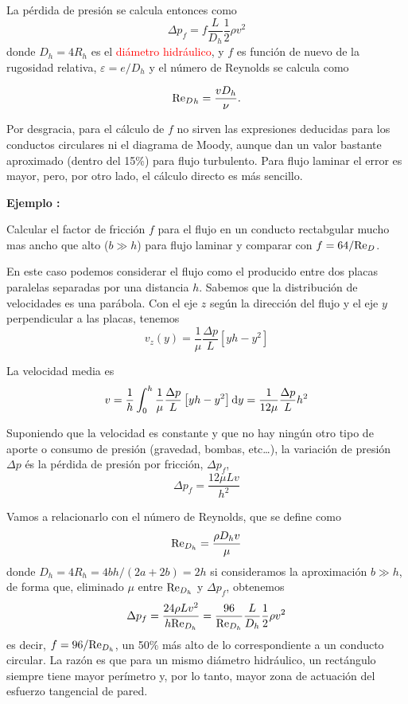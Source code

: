 La pérdida de presión se calcula entonces como
\[
\Delta p_f = f \frac{L}{D_h} \frac{1}{2} \rho v^2
\]
donde $D_h = 4 R_h$ es el \textcolor{red}{diámetro hidráulico}, y $f$ es función de nuevo de la rugosidad relativa, $\varepsilon= e/D_h$ y el número de Reynolds se calcula como

\begin{equation}
	{\text{Re}_D}_h = \frac{v D_h}{\nu}.
\end{equation}


Por desgracia, para el cálculo de $f$ no sirven las expresiones deducidas para los conductos circulares ni el diagrama de Moody, aunque dan un valor bastante aproximado (dentro del 15\%) para flujo turbulento. Para flujo laminar el error es mayor, pero, por otro lado, el cálculo directo es más sencillo.

\textbf{Ejemplo : }

Calcular el factor de fricción $f$ para el flujo en un conducto rectabgular mucho mas ancho que alto ($b \gg h$) para flujo laminar y comparar con $f=64/\text{Re}_D$.

En este caso podemos considerar el flujo como el producido entre dos placas paralelas separadas por una distancia $h$. Sabemos que la distribución de velocidades es una parábola. Con el eje $z$ según la dirección del flujo y el eje $y$ perpendicular a las placas, tenemos
\[
v_z(y) = \frac{1}{\mu}\frac{\Delta p}{L}\left[y h -y^2\right]
\]

La velocidad media es
\[
v = \frac{1}{h}\int_0^h\frac{1}{\mu}\frac{\Delta p}{L}\left[y h -y^2\right] \text{d} y =
\frac{1}{12 \mu}\frac{\Delta p}{L} h^2
\]

Suponiendo que la velocidad es constante y que no hay ningún otro tipo de aporte o consumo de presión (gravedad, bombas, etc\ldots), la variación de presión $\Delta p$ és la pérdida de presión por fricción, $\Delta p_f$,
\[
\Delta p_f = \frac{12 \mu L v} {h^2}
\]

Vamos a relacionarlo con el número de Reynolds, que se define como
\[
\text{Re}_{D_h} = \frac{\rho D_h v}{\mu}
\]
donde $D_h = 4R_h = 4bh/(2a+2b)=2h$ si consideramos la aproximación $b \gg h$, de forma que, eliminado $\mu$ entre $\text{Re}_{D_h}$ y $\Delta p_f$, obtenemos
\[
\Delta p_f = \frac{24 \rho L v^2}{h\text{Re}_{D_h}} = \frac{96}{\text{Re}_{D_h}} \frac{L}{D_h} \frac{1}{2}\rho v^2
\]
es decir, $f ={96}/{\text{Re}_{D_h}}$, un 50\% más alto de lo correspondiente a un conducto circular.  La razón es que para un mismo diámetro hidráulico, un rectángulo siempre tiene mayor perímetro y, por lo tanto, mayor zona de actuación del esfuerzo tangencial de pared.


